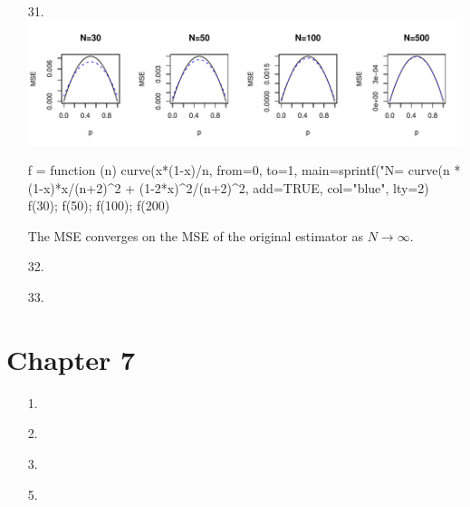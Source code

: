 \documentclass{article}
\begin{document}
\begin{enumerate}
\newpage
\item[31.]\hspace{0em}\\
\includegraphics[width=\textwidth]{6-31.pdf}
\begin{code}
f = function (n) {
  curve(x*(1-x)/n, from=0, to=1, main=sprintf("N=%
  curve(n * (1-x)*x/(n+2)^2 + (1-2*x)^2/(n+2)^2, add=TRUE, col="blue", lty=2)
}
f(30); f(50); f(100); f(200)
\end{code}
The MSE converges on the MSE of the original estimator as $N \rightarrow \infty$.

\item[32.]

\item[33.]

\end{enumerate}

\section*{Chapter 7}
\begin{enumerate}

\item[1.]

\item[2.]

\item[3.]

\item[5.]

\end{enumerate}
\end{document}
